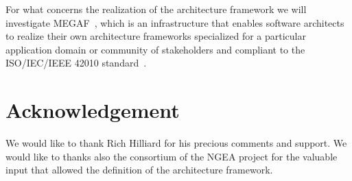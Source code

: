 For what concerns the realization of the architecture framework we will investigate MEGAF~\cite{MEGAF2010,MEGAF2012}, 
%
%
which is an infrastructure that enables software architects to realize their
own architecture frameworks specialized for a particular
application domain or community of stakeholders and compliant to the ISO/IEC/IEEE 42010 standard~\cite{42010}. 

\section*{Acknowledgement}

We would like to thank Rich Hilliard for his precious comments and support. We would like to thanks also the consortium of the NGEA project for the valuable input that allowed the definition of the architecture framework.